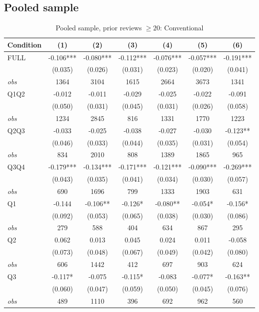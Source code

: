 \subsection{Pooled sample}
\begin{table}[!htbp]
\centering
\caption{Pooled sample, prior reviews $\geq20$: Conventional}
\begin{tabular}{lcccccc}
\toprule
Condition & (1) & (2) & (3) & (4) & (5) & (6) \\
\midrule
FULL & -0.106*** & -0.080*** & -0.112*** & -0.076*** & -0.057*** & -0.191*** \\
 & (0.035) & (0.026) & (0.031) & (0.023) & (0.020) & (0.041) \\
\textit{obs} & 1364 & 3104 & 1615 & 2664 & 3673 & 1341 \\
Q1Q2 & -0.012 & -0.011 & -0.029 & -0.025 & -0.022 & -0.091 \\
 & (0.050) & (0.031) & (0.045) & (0.031) & (0.026) & (0.058) \\
\textit{obs} & 1234 & 2845 & 816 & 1331 & 1770 & 1223 \\
Q2Q3 & -0.033 & -0.025 & -0.038 & -0.027 & -0.030 & -0.123** \\
 & (0.046) & (0.033) & (0.044) & (0.035) & (0.031) & (0.054) \\
\textit{obs} & 834 & 2010 & 808 & 1389 & 1865 & 965 \\
Q3Q4 & -0.179*** & -0.134*** & -0.171*** & -0.121*** & -0.090*** & -0.269*** \\
 & (0.043) & (0.035) & (0.041) & (0.034) & (0.030) & (0.057) \\
\textit{obs} & 690 & 1696 & 799 & 1333 & 1903 & 631 \\
Q1 & -0.144 & -0.106** & -0.126* & -0.080** & -0.054* & -0.156* \\
 & (0.092) & (0.053) & (0.065) & (0.038) & (0.030) & (0.086) \\
\textit{obs} & 279 & 588 & 404 & 634 & 867 & 295 \\
Q2 & 0.062 & 0.013 & 0.045 & 0.024 & 0.011 & -0.058 \\
 & (0.073) & (0.048) & (0.067) & (0.049) & (0.042) & (0.080) \\
\textit{obs} & 606 & 1442 & 412 & 697 & 903 & 624 \\
Q3 & -0.117* & -0.075 & -0.115* & -0.083 & -0.077* & -0.163** \\
 & (0.060) & (0.047) & (0.059) & (0.050) & (0.045) & (0.076) \\
\textit{obs} & 489 & 1110 & 396 & 692 & 962 & 560 \\

\end{tabular}
\end{table}
